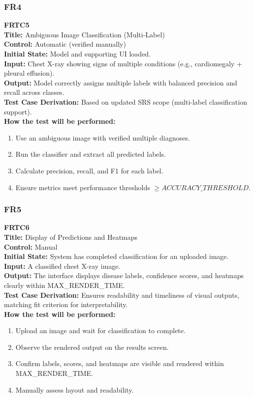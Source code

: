 \documentclass[12pt, titlepage]{article}
\begin{document}
\subsubsection{FR4}
\textbf{FRTC5}\\
\textbf{Title:} Ambiguous Image Classification (Multi-Label)\\
\textbf{Control:} Automatic (verified manually)\\
\textbf{Initial State:} Model and supporting UI loaded.\\
\textbf{Input:} Chest X-ray showing signs of multiple conditions (e.g., cardiomegaly + pleural effusion).\\
\textbf{Output:} Model correctly assigns multiple labels with balanced precision and recall across classes.\\
\textbf{Test Case Derivation:} Based on updated SRS scope (multi-label classification support).\\
\textbf{How the test will be performed:}
\begin{enumerate}
  \item Use an ambiguous image with verified multiple diagnoses.
  \item Run the classifier and extract all predicted labels.
  \item Calculate precision, recall, and F1 for each label.
  \item Ensure metrics meet performance thresholds \( \geq ACCURACY\_THRESHOLD \).
\end{enumerate}
\vspace{1em}

\subsubsection{FR5}
\textbf{FRTC6}\\
\textbf{Title:} Display of Predictions and Heatmaps\\
\textbf{Control:} Manual\\
\textbf{Initial State:} System has completed classification for an uploaded image.\\
\textbf{Input:} A classified chest X-ray image.\\
\textbf{Output:} The interface displays disease labels, confidence scores, and heatmaps clearly within MAX\_RENDER\_TIME.\\
\textbf{Test Case Derivation:} Ensures readability and timeliness of visual outputs, matching fit criterion for interpretability.\\
\textbf{How the test will be performed:}
\begin{enumerate}
  \item Upload an image and wait for classification to complete.
  \item Observe the rendered output on the results screen.
  \item Confirm labels, scores, and heatmaps are visible and rendered within MAX\_RENDER\_TIME.
  \item Manually assess layout and readability.
\end{enumerate}
\end{document}

